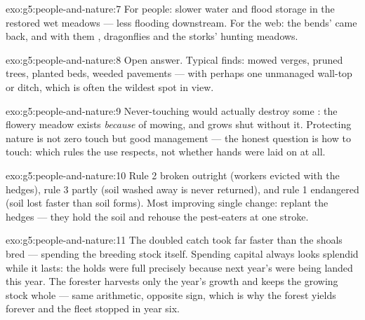 \begin{solution}{exo:g5:people-and-nature:7}
For people: slower water and flood storage in the restored
wet meadows --- less flooding downstream. For the web: the
bends'  came back, and with them , dragonflies
and the storks' hunting meadows.
\end{solution}

\begin{solution}{exo:g5:people-and-nature:8}
Open answer. Typical finds: mowed verges, pruned trees,
planted beds, weeded pavements --- with perhaps one
unmanaged wall-top or ditch, which is often the wildest
spot in view.
\end{solution}

\begin{solution}{exo:g5:people-and-nature:9}
Never-touching would actually destroy some : the
flowery meadow exists \emph{because} of mowing, and grows
shut without it. Protecting nature is not zero touch but
good management --- the honest question is how to touch:
which rules the use respects, not whether hands were laid
on at all.
\end{solution}

\begin{solution}{exo:g5:people-and-nature:10}
Rule 2 broken outright (workers evicted with the hedges),
rule 3 partly (soil washed away is never returned), and
rule 1 endangered (soil lost faster than soil forms). Most
improving single change: replant the hedges --- they hold
the soil and rehouse the pest-eaters at one stroke.
\end{solution}

\begin{solution}{exo:g5:people-and-nature:11}
The doubled catch took  far faster than the shoals bred
--- spending the breeding stock itself. Spending capital
always looks splendid while it lasts: the holds were full
precisely because next year's  were being landed this
year. The forester harvests only the year's growth and
keeps the growing stock whole --- same arithmetic, opposite
sign, which is why the forest yields forever and the fleet
stopped in year six.
\end{solution}
